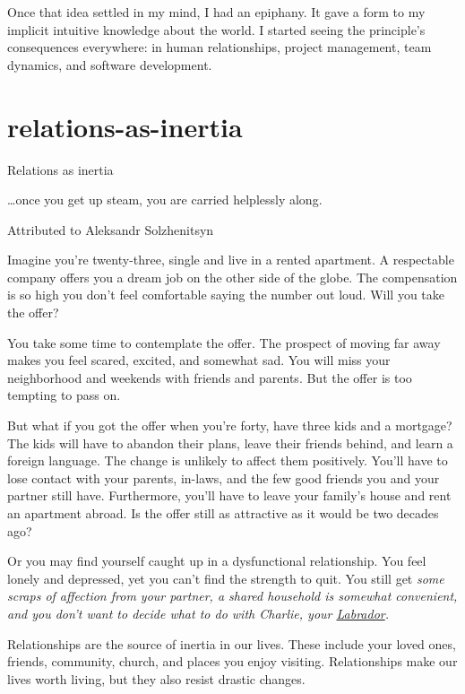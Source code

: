 \documentclass{article}
\begin{document}
Once that idea settled in my mind, I had an epiphany.
It gave a form to my implicit intuitive knowledge about the world.
I started seeing the principle's consequences everywhere: in human relationships, project management, team dynamics, and software development.

\section{relations-as-inertia}{Relations as inertia}

\epigraph{
    \ldots once you get up steam, you are carried helplessly along.
}{Attributed to Aleksandr Solzhenitsyn}

Imagine you're twenty-three, single and live in a rented apartment.
A respectable company offers you a dream job on the other side of the globe.
The compensation is so high you don't feel comfortable saying the number out loud.
Will you take the offer?

You take some time to contemplate the offer.
The prospect of moving far away makes you feel scared, excited, and somewhat sad.
You will miss your neighborhood and weekends with friends and parents.
But the offer is too tempting to pass on.

But what if you got the offer when you're forty, have three kids and a mortgage?
The kids will have to abandon their plans, leave their friends behind, and learn a foreign language.
The change is unlikely to affect them positively.
You'll have to lose contact with your parents, in-laws, and the few good friends you and your partner still have.
Furthermore, you'll have to leave your family's house and rent an apartment abroad.
Is the offer still as attractive as it would be two decades ago?

Or you may find yourself caught up in a dysfunctional relationship.
You feel lonely and depressed, yet you can't find the strength to quit.
You still get \em{some} scraps of affection from your partner, a shared household is somewhat convenient, and you don't want to decide what to do with Charlie, your \href{https://en.wikipedia.org/wiki/Labrador_Retriever}{Labrador}.

Relationships are the source of inertia in our lives.
These include your loved ones, friends, community, church, and places you enjoy visiting.
Relationships make our lives worth living, but they also resist drastic changes.
\end{document}
